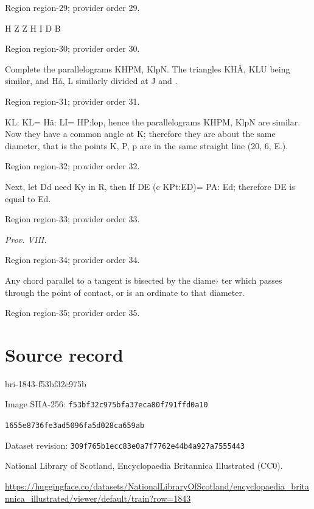 \documentclass[11pt]{article}
\begin{document}
{\scriptsize\color{gray} Region region-29; provider order 29.\par}
\medskip

H
Z
Z
H
I
D
B
\par

{\scriptsize\color{gray} Region region-30; provider order 30.\par}
\medskip

Complete the parallelograms KHPM, KlpN. The triangles KHÅ, KLU being similar, and Hå, L similarly divided at J and .
\par

{\scriptsize\color{gray} Region region-31; provider order 31.\par}
\medskip

KL: KL= Hä: LI= HP:lop, hence the parallelograms KHPM, KlpN are similar. Now they have a common angle at K; therefore they are about the same diameter, that is the points K, P, p are in the same straight line (20, 6, E.).
\par

{\scriptsize\color{gray} Region region-32; provider order 32.\par}
\medskip

Next, let Dd need Ky in R, then If DE (c KPt:ED)= PA: Ed; therefore DE is equal to Ed.
\par

{\scriptsize\color{gray} Region region-33; provider order 33.\par}
\medskip

{\small\itshape Prov. VIII.\par}

{\scriptsize\color{gray} Region region-34; provider order 34.\par}
\medskip

Any chord parallel to a tangent is bisected by the diame› ter which passes through the point of contact, or is an ordinate to that diameter.
\par

{\scriptsize\color{gray} Region region-35; provider order 35.\par}
\medskip
\newpage\section*{Source record}
bri-1843-f53bf32c975b\par
Image SHA-256: \texttt{f53bf32c975bfa37eca80f791ffd0a10}\par\texttt{1655e8736fe3ad5096fa5d028ca659ab}\par
Dataset revision: \texttt{309f765b1ecc83e0a7f7}\texttt{762e44b4a927a7555443}\par
National Library of Scotland, Encyclopaedia Britannica Illustrated (CC0).\par
\url{https://huggingface.co/datasets/NationalLibraryOfScotland/encyclopaedia_britannica_illustrated/viewer/default/train?row=1843}
\end{document}
